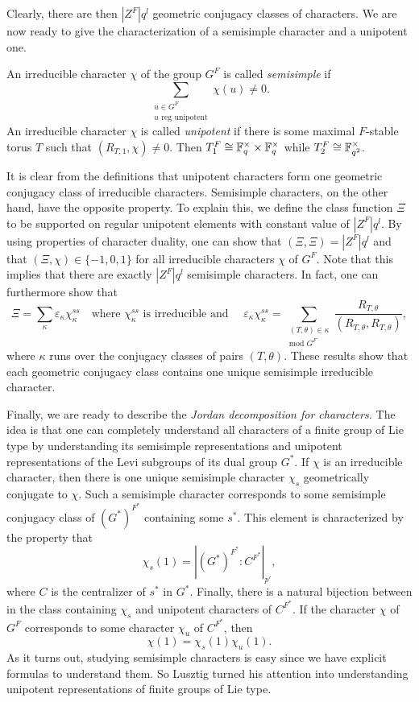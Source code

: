 Clearly, there are then $|Z^F|q^l$ geometric conjugacy classes of characters. We are now ready to give the characterization of a semisimple character and a unipotent one.

\begin{definition}
    An irreducible character $\chi$ of the group $G^F$ is called \textit{semisimple} if 
    \begin{equation*}
        \sum_{\substack{u\in G^F\\u \text{ reg unipotent}}}\chi(u)\neq0.
    \end{equation*}
    An irreducible character $\chi$ is called \textit{unipotent} if there is some maximal $F$-stable torus $T$ such that $(R_{T,1},\chi)\neq0$. Then $T_1^F\cong \mathbb{F}_q^\times\times\mathbb{F}_q^\times$ while $T_2^F\cong\mathbb{F}_{q^2}^\times$.
\end{definition}

It is clear from the definitions that unipotent characters form one geometric conjugacy class of irreducible characters. Semisimple characters, on the other hand, have the opposite property. To explain this, we define the class function $\Xi$ to be supported on regular unipotent elements with constant value of $|Z^F|q^l$. By using properties of character duality, one can show that $(\Xi,\Xi)=|Z^F|q^l$ and that $(\Xi,\chi)\in\{-1,0,1\}$ for all irreducible characters $\chi$ of $G^F$. Note that this implies that there are exactly $|Z^F|q^l$ semisimple characters. In fact, one can furthermore show that 
\begin{equation*}
    \Xi=\sum_{\kappa}\varepsilon_\kappa\chi_\kappa^{ss} \quad\text{where }\chi_\kappa^{ss}\text{ is irreducible and }\quad \varepsilon_\kappa\chi_\kappa^{ss}=\sum_{\substack{(T,\theta)\in\kappa\\\text{mod }G^F}}\frac{R_{T,\theta}}{(R_{T,\theta},R_{T,\theta})},
\end{equation*}
where $\kappa$ runs over the conjugacy classes of pairs $(T,\theta)$. These results show that each geometric conjugacy class contains one unique semisimple irreducible character. 

Finally, we are ready to describe the \textit{Jordan decomposition for characters.} The idea is that one can completely understand all characters of a finite group of Lie type by understanding its semisimple representations and unipotent representations of the Levi subgroups of its dual group $G^*$. If $\chi$ is an irreducible character, then there is one unique semisimple character $\chi_s$ geometrically conjugate to $\chi$. Such a semisimple character corresponds to some semisimple conjugacy class of $(G^*)^{F^*}$ containing some $s^*$. This element is characterized by the property that $$\chi_s(1)=|(G^*)^{F^*}:C^{F^*}|_{p'},$$
where $C$ is the centralizer of $s^*$ in $G^*$. Finally, there is a natural bijection between in the class containing $\chi_s$ and unipotent characters of $C^{F^*}$. If the character $\chi$ of $G^F$ corresponds to some character $\chi_u$ of $C^{F^*}$, then
$$\chi(1)=\chi_s(1)\chi_u(1).$$
As it turns out, studying semisimple characters is easy since we have explicit formulas to understand them. So Lusztig turned his attention into understanding unipotent representations of finite groups of Lie type. 

